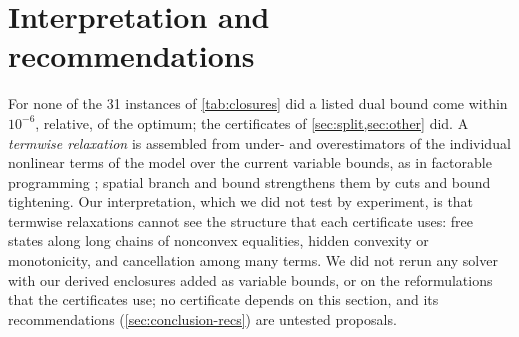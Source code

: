 \section{Interpretation and recommendations}\label{sec:interpretation}

For none of the 31 instances of \cref{tab:closures} did a listed dual bound come within $10^{-6}$, relative, of the optimum; the certificates of \cref{sec:split,sec:other} did.
A \emph{termwise relaxation} is assembled from under- and overestimators of the individual nonlinear terms of the model over the current variable bounds, as in factorable programming \citep{neumaier2004-complete-search-in-continuous-global,belotti2009-branching-and-bounds-tightening-techniques}; spatial branch and bound strengthens them by cuts and bound tightening.
Our interpretation, which we did not test by experiment, is that termwise relaxations cannot see the structure that each certificate uses: free states along long chains of nonconvex equalities, hidden convexity or monotonicity, and cancellation among many terms.
We did not rerun any solver with our derived enclosures added as variable bounds, or on the reformulations that the certificates use; no certificate depends on this section, and its recommendations (\cref{sec:conclusion-recs}) are untested proposals.

